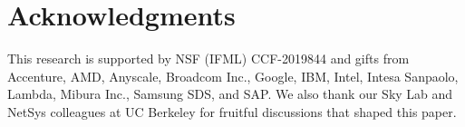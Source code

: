 \section*{Acknowledgments}
This research is supported by NSF (IFML) CCF-2019844 and gifts from Accenture, AMD, Anyscale, Broadcom Inc., Google, IBM, Intel, Intesa Sanpaolo, Lambda, Mibura Inc., Samsung SDS, and SAP. We also thank our Sky Lab and NetSys colleagues at UC Berkeley for fruitful discussions that shaped this paper.

